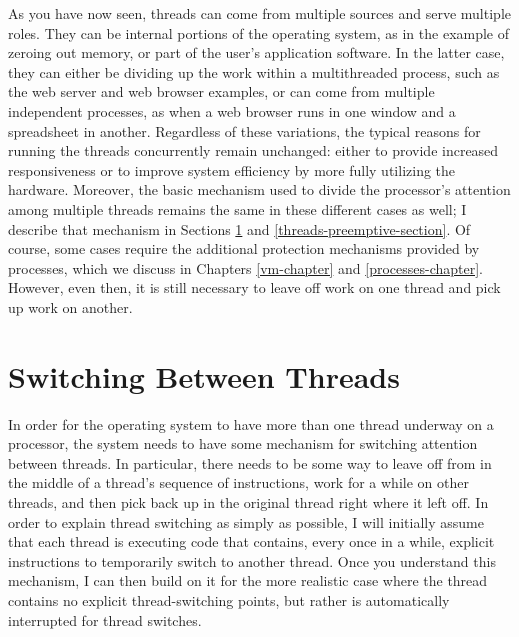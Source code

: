 As you have now seen, threads can come from multiple sources and serve
multiple roles.  They can be internal portions of the operating
system, as in the example of zeroing out memory, or part of the user's
application software.  In the latter case, they can either be dividing
up the work within a multithreaded process, such as the web server
and web browser examples, or can come from multiple independent
processes, as when a web browser runs in one window and a spreadsheet
in another.  Regardless of these variations, the typical reasons
for running the threads concurrently remain unchanged: either to provide
increased responsiveness or to improve system efficiency by more fully
utilizing the hardware.  Moreover, the basic mechanism used to divide
the processor's attention among multiple threads remains the same in
these different cases as well; I describe that mechanism in Sections
\ref{threads-switching-section} and \ref{threads-preemptive-section}.
Of course, some cases require the additional protection mechanisms
provided by processes,
which we discuss in Chapters \ref{vm-chapter} and
\ref{processes-chapter}.  However, even then, it is still necessary to
leave off work on one thread and pick up work on another.

\section{Switching Between Threads}\label{threads-switching-section}

In order for the operating system to have more than one thread
underway on a processor, the system needs to have some mechanism for
switching attention between threads.  In particular, there needs to be
some way to leave off from in the middle of a thread's sequence of
instructions, work for a while on other threads, and then pick back up
in the original thread right where it left off.  In order to explain
thread switching as simply as possible, I will initially assume that
each thread is executing code that contains, every once in a while,
explicit instructions to temporarily switch to another thread.  Once
you understand this mechanism, I can then build on it for the more
realistic case where the thread contains no explicit thread-switching
points, but rather is automatically interrupted for thread switches.

